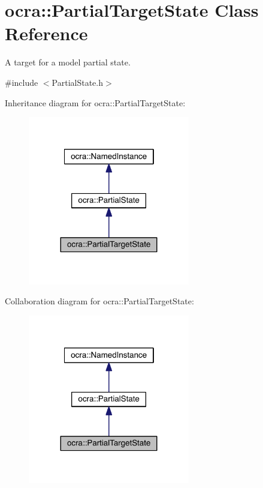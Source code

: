 \hypertarget{classocra_1_1PartialTargetState}{}\section{ocra\+:\+:Partial\+Target\+State Class Reference}
\label{classocra_1_1PartialTargetState}


A target for a model partial state.  




{\ttfamily \#include $<$Partial\+State.\+h$>$}



Inheritance diagram for ocra\+:\+:Partial\+Target\+State\+:\nopagebreak
\begin{figure}[H]
\begin{center}
\leavevmode
\includegraphics[width=200pt]{de/dc1/classocra_1_1PartialTargetState__inherit__graph}
\end{center}
\end{figure}


Collaboration diagram for ocra\+:\+:Partial\+Target\+State\+:\nopagebreak
\begin{figure}[H]
\begin{center}
\leavevmode
\includegraphics[width=200pt]{d5/d19/classocra_1_1PartialTargetState__coll__graph}
\end{center}
\end{figure}
